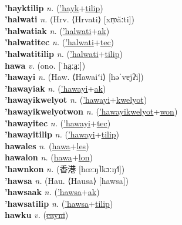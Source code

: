  \label{'hayktec} \\
\textbf{'hayktilip} \textit{n.} (\hyperref['hayk]{'hayk}+\hyperref[tilip]{tilip})
 \label{'hayktilip} \\
\textbf{'halwati} \textit{n.} (Hrv. ⟨Hrvati⟩ [xr̩ʋăːti])
 \label{'halwati} \\
\textbf{'halwatiak} \textit{n.} (\hyperref['halwati]{'halwati}+\hyperref[ak]{ak})
 \label{'halwatiak} \\
\textbf{'halwatitec} \textit{n.} (\hyperref['halwati]{'halwati}+\hyperref[tec]{tec})
 \label{'halwatitec} \\
\textbf{'halwatitilip} \textit{n.} (\hyperref['halwati]{'halwati}+\hyperref[tilip]{tilip})
 \label{'halwatitilip} \\
\textbf{hawa} \textit{v.} (ono. [ˈha̤ːa̤ː])
 \label{hawa} \\
\textbf{'hawayi} \textit{n.} (Haw. ⟨Hawaiʻi⟩ [həˈvɐjʔi])
 \label{'hawayi} \\
\textbf{'hawayiak} \textit{n.} (\hyperref['hawayi]{'hawayi}+\hyperref[ak]{ak})
 \label{'hawayiak} \\
\textbf{'hawayikwelyot} \textit{n.} (\hyperref['hawayi]{'hawayi}+\hyperref[kwelyot]{kwelyot})
 \label{'hawayikwelyot} \\
\textbf{'hawayikwelyotwon} \textit{n.} (\hyperref['hawayikwelyot]{'hawayikwelyot}+\hyperref[won]{won})
 \label{'hawayikwelyotwon} \\
\textbf{'hawayitec} \textit{n.} (\hyperref['hawayi]{'hawayi}+\hyperref[tec]{tec})
 \label{'hawayitec} \\
\textbf{'hawayitilip} \textit{n.} (\hyperref['hawayi]{'hawayi}+\hyperref[tilip]{tilip})
 \label{'hawayitilip} \\
\textbf{hawales} \textit{n.} (\hyperref[hawa]{hawa}+\hyperref[les]{les})
 \label{hawales} \\
\textbf{hawalon} \textit{n.} (\hyperref[hawa]{hawa}+\hyperref[lon]{lon})
 \label{hawalon} \\
\textbf{'hawnkon} \textit{n.} ({\chinese{}香港} [hœːŋ˥kɔːŋ˧˥])
 \label{'hawnkon} \\
\textbf{'hawsa} \textit{n.} (Hau. ⟨Hausa⟩ [hawsa])
 \label{'hawsa} \\
\textbf{'hawsaak} \textit{n.} (\hyperref['hawsa]{'hawsa}+\hyperref[ak]{ak})
 \label{'hawsaak} \\
\textbf{'hawsatilip} \textit{n.} (\hyperref['hawsa]{'hawsa}+\hyperref[tilip]{tilip})
 \label{'hawsatilip} \\
\textbf{hawku} \textit{v.} (\hyperref[cayni]{\sout{cayni}})

